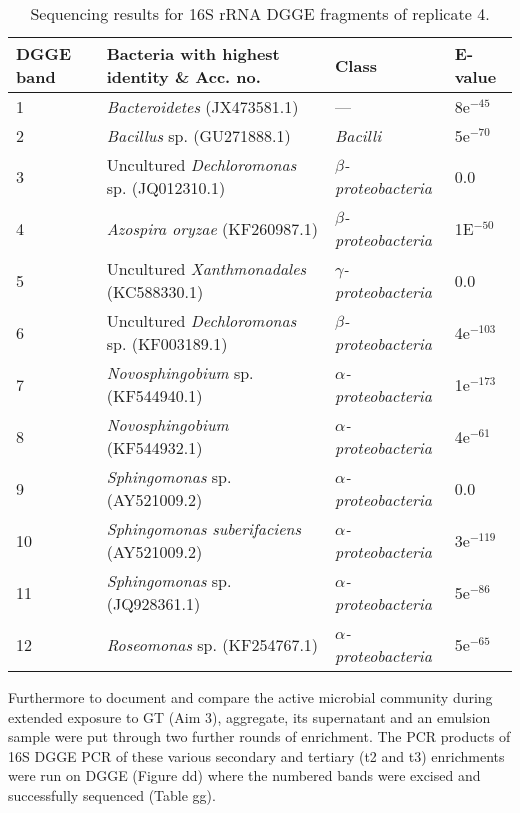 \documentclass[11pt]{article}
\begin{document}
\begin{table}
\caption{Sequencing results for 16S rRNA DGGE fragments of replicate 4.}
\begin{tabular}{ | l | p{7.8cm} | p{3cm} | l | }
\hline
DGGE band & Bacteria with highest identity \& Acc. no. & Class & E-value \\
\hline
1   &  \emph{Bacteroidetes} (JX473581.1) & --- & 8e$^{-45}$ \\
\hline
2  & \emph{Bacillus} sp. (GU271888.1) & \emph{Bacilli} & 5e$^{-70}$ \\
\hline
3 & Uncultured \emph{Dechloromonas} sp. (JQ012310.1) & \emph{$\beta$-proteobacteria} & 0.0 \\
\hline
4 & \emph{Azospira oryzae} (KF260987.1) & \emph{$\beta$-proteobacteria} & 1E$^{-50}$ \\
\hline
5 & Uncultured \emph{Xanthmonadales} (KC588330.1) & \emph{$\gamma$-proteobacteria} & 0.0 \\
\hline
6 & Uncultured \emph{Dechloromonas} sp. (KF003189.1) & \emph{$\beta$-proteobacteria} & 4e$^{-103}$ \\
\hline
7 & \emph{Novosphingobium} sp. (KF544940.1) & \emph{$\alpha$-proteobacteria} & 1e$^{-173}$ \\
\hline
8 & \emph{Novosphingobium} (KF544932.1) & \emph{$\alpha$-proteobacteria} & 4e$^{-61}$ \\
\hline
9 & \emph{Sphingomonas} sp. (AY521009.2) & \emph{$\alpha$-proteobacteria} & 0.0 \\
\hline
10 & \emph{Sphingomonas suberifaciens} (AY521009.2) & \emph{$\alpha$-proteobacteria} & 3e$^{-119}$ \\
\hline
11 & \emph{Sphingomonas} sp. (JQ928361.1) & \emph{$\alpha$-proteobacteria} & 5e$^{-86}$ \\
\hline
12 & \emph{Roseomonas} sp.  (KF254767.1) & \emph{$\alpha$-proteobacteria} & 5e$^{-65}$ \\
\hline
\end{tabular}

\end{table}
\FloatBarrier

Furthermore to document and compare the active microbial community during extended exposure to GT (Aim 3), aggregate, its supernatant and an emulsion sample were put through two further rounds of enrichment. The PCR products of 16S DGGE PCR of these various secondary and tertiary (t2 and t3) enrichments were run on DGGE (Figure dd) where the numbered bands were excised and successfully sequenced (Table gg). 
\end{document}
